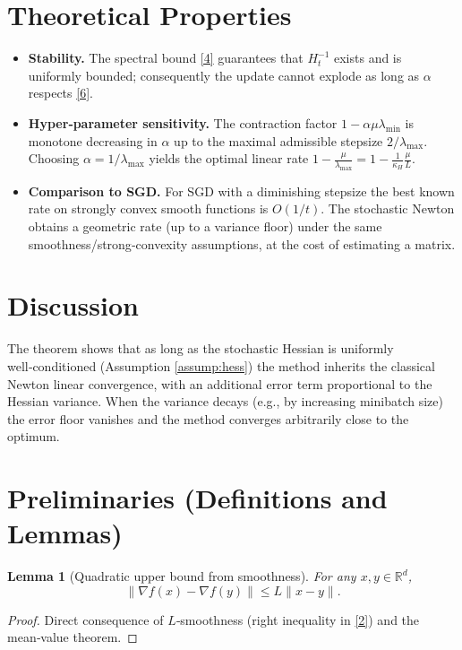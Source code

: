\documentclass{article}
\newtheorem{lemma}{Lemma}
\newcommand{\R}{\mathbb{R}}
\begin{document}
\section*{Theoretical Properties}
\begin{itemize}
\item \textbf{Stability.} The spectral bound \eqref{4} guarantees that $H_{t}^{-1}$ exists and is uniformly bounded; consequently the update cannot explode as long as $\alpha$ respects \eqref{6}.
\item \textbf{Hyper‑parameter sensitivity.} The contraction factor $1-\alpha\mu\lambda_{\min}$ is monotone decreasing in $\alpha$ up to the maximal admissible stepsize $2/\lambda_{\max}$.  Choosing $\alpha=1/\lambda_{\max}$ yields the optimal linear rate $1-\frac{\mu}{\lambda_{\max}}=1-\frac{1}{\kappa_{H}}\frac{\mu}{L}$.
\item \textbf{Comparison to SGD.} For SGD with a diminishing stepsize the best known rate on strongly convex smooth functions is $O(1/t)$.  The stochastic Newton obtains a geometric rate (up to a variance floor) under the same smoothness/strong‑convexity assumptions, at the cost of estimating a matrix.
\end{itemize}

\section*{Discussion}
The theorem shows that as long as the stochastic Hessian is uniformly well‑conditioned (Assumption \ref{assump:hess}) the method inherits the classical Newton linear convergence, with an additional error term proportional to the Hessian variance.  When the variance decays (e.g., by increasing minibatch size) the error floor vanishes and the method converges arbitrarily close to the optimum.

\newpage
\section*{Preliminaries (Definitions and Lemmas)}
\begin{lemma}[Quadratic upper bound from smoothness]\label{lem:smooth}
For any $x,y\in\R^{d}$,
\[
\|\nabla f(x)-\nabla f(y)\|\le L\|x-y\|.
\tag{9}
\]
\end{lemma}
\begin{proof}
Direct consequence of $L$‑smoothness (right inequality in \eqref{2}) and the mean‑value theorem. \qedhere
\end{proof}
\end{document}

